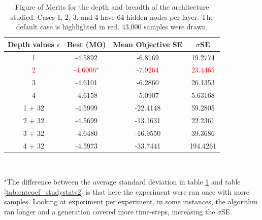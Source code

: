 \begin{table}[H]
    \centering
    \caption{Figure of Merits for the depth and breadth of the architecture studied. Cases 1, 2, 3, and 4 have 64 hidden nodes per layer. The default case is highlighted in red. 43,000 samples were drawn.}
    \begin{tabular}{c|c|c|c}
    \hline
    Depth values $\epsilon$ & Best (MO) & Mean Objective SE & $\sigma$SE \\
    \hline
     1      & -4.5892                            & -6.8169 & 19.2774\\
     \textcolor{red}{2}      & \textcolor{red}{-4.6006$^{\star}$} & \textcolor{red}{-7.9264} & \textcolor{red}{23.4465}\\
     3      & -4.6101                            & -6.2860 & 26.1353\\
     4      & -4.6158                            & -5.0907 & 5.63168\\
     1 + 32 & -4.5999                            & -22.4148 & 59.2805\\
     2 + 32 & -4.5699                            & -13.1631 & 22.2361\\
     3 + 32 & -4.6480                            & -16.9550 & 39.3686\\
     4 + 32 & -4.5973                            & -33.7441 & 194.4261\\
     \end{tabular}
    \label{tab:architecture_study}\\
    \begin{tablenotes}
      \item  \footnotesize$^{\star}$The difference between the average standard deviation in table \ref{tab:architecture_study} and table \ref{tab:entcoef_studystats2} is that here the experiment were ran once with more samples. Looking at experiment per experiment, in some instances, the algorithm ran longer and a generation covered more time-steps, increasing the $\sigma$SE.
    \end{tablenotes}
\end{table}
